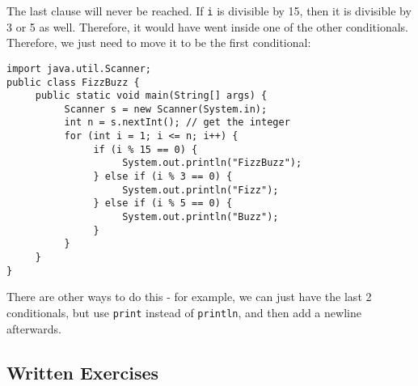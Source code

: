 The last clause will never be reached. If \texttt{i} is divisible by 15, then it is divisible by 3 or 5 as well. Therefore, it would have went inside one of the other conditionals. Therefore, we just need to move it to be the first conditional:
\begin{lstlisting}
import java.util.Scanner;
public class FizzBuzz {
     public static void main(String[] args) {
          Scanner s = new Scanner(System.in);
          int n = s.nextInt(); // get the integer
          for (int i = 1; i <= n; i++) {
               if (i % 15 == 0) {
                    System.out.println("FizzBuzz");
               } else if (i % 3 == 0) {
                    System.out.println("Fizz");
               } else if (i % 5 == 0) {
                    System.out.println("Buzz");
               }
          }
     }
}
\end{lstlisting}
There are other ways to do this - for example, we can just have the last 2 conditionals, but use \texttt{print} instead of \texttt{println}, and then add a newline afterwards.

\subsection{Written Exercises}


